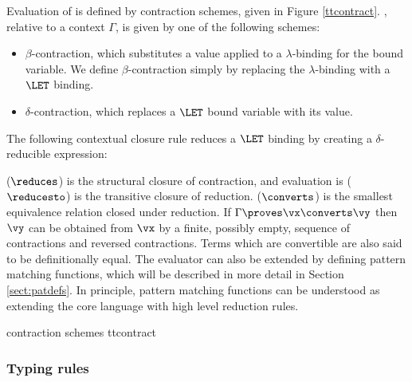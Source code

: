 \label{sect:evaluation}

Evaluation of \TT{} is defined by contraction schemes, given in Figure
\ref{ttcontract}. , relative to a context $\Gamma$, is given
by one of the following schemes:

\begin{itemize}
\item $\beta$-contraction, which substitutes a value applied to a $\lambda$-binding for
the bound variable. We define $\beta$-contraction simply by replacing the $\lambda$-binding
with a $\LET$ binding.
\item $\delta$-contraction, which replaces a $\LET$ bound variable with its value.
\end{itemize}

\noindent
The following contextual closure rule reduces a $\LET$ binding by creating
a $\delta$-reducible expression:


 ($\reduces$) is the structural closure of contraction, and evaluation
is ($\reducesto$) is the transitive closure of reduction.  ($\converts$)
is the smallest equivalence relation closed under reduction. If $\Gamma\proves\vx\converts\vy$
then $\vy$ can be obtained from $\vx$ by a finite, possibly empty, sequence of
contractions and reversed contractions. Terms which are convertible are also said to
be definitionally equal.
The evaluator can also be extended by defining pattern matching functions, which
will be described in more detail in Section \ref{sect:patdefs}. In principle, pattern
matching functions can be understood as extending the core language with high level
reduction rules.

{\TT{} contraction schemes}
{ttcontract}



\subsubsection{Typing rules}

